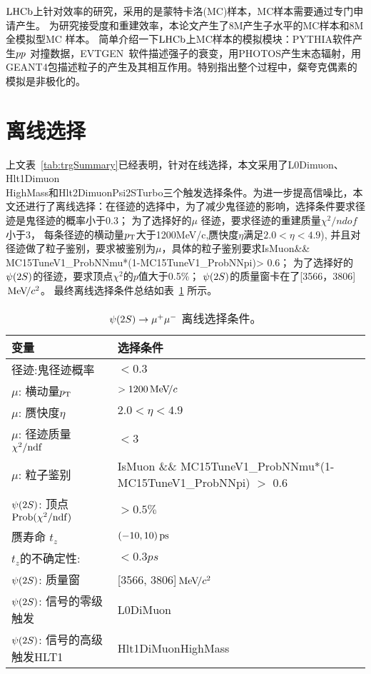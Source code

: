 $\mbox{LHCb}$上针对效率的研究，采用的是蒙特卡洛(MC)样本，MC样本需要通过专门申请产生。
为研究接受度和重建效率，本论文产生了8M产生子水平的MC样本和8M全模拟型MC 样本。
简单介绍一下$\mbox{LHCb}$上MC样本的模拟模块：PYTHIA软件产生${pp}$ 对撞数据，EVTGEN~\cite{Belyaev:2011zza}软件描述强子的衰变，用PHOTOS产生末态辐射，用GEANT4包描述粒子的产生及其相互作用。特别指出整个过程中，粲夸克偶素的模拟是非极化的。

\section{离线选择}

上文表~\ref{tab:trgSummary}已经表明，针对在线选择，本文采用了L0Dimuon、Hlt1Dimuon\\HighMass和Hlt2DimuonPsi2STurbo三个触发选择条件。为进一步提高信噪比，本文还进行了离线选择：在径迹的选择中，为了减少鬼径迹的影响，选择条件要求径迹是鬼径迹的概率小于0.3；
为了选择好的$\mu$ 径迹，要求径迹的重建质量$\chi^{2}/ndof$ 小于3， 每条径迹的横动量$\mbox{$p_{\mathrm{ T}}$}$大于1200MeV/c,赝快度$\eta$满足$2.0<\eta<4.9$), 并且对径迹做了粒子鉴别，要求被鉴别为$\mu$，具体的粒子鉴别要求IsMuon\&\& MC15TuneV1\_ProbNNmu*(1-MC15TuneV1\_ProbNNpi)> 0.6；
为了选择好的${\psi{(2S)}}$的径迹，要求顶点$\chi^{2}$的$p$值大于0.5\%；
${\psi{(2S)}}$的质量窗卡在了[3566，3806]${\mathrm{\,Me\kern -0.1em V\!/}c^2}$。
最终离线选择条件总结如表~\ref{tab:selections} 所示。

\begin{table}[!htb]
\tabcolsep 5mm
\begin{center}
\caption{${\psi{(2S)}} \rightarrow \mu^+\mu^-$ 离线选择条件。}
\begin{tabular}{l|l}
\hline 变量& 选择条件 \\
\hline
径迹:鬼径迹概率 & $<0.3$\\
$\mu$: 横动量$\mbox{$p_{\mathrm{ T}}$}$ & $>1200{\mathrm{\,Me\kern -0.1em V\!/}c}$\\
$\mu$: 赝快度$\eta$ & $2.0<\eta<4.9$\\
$\mu$: 径迹质量 $ \chi^2/\mathrm{ndf}$&$<3$\\
$\mu$: 粒子鉴别 & \footnotesize {IsMuon \&\& MC15TuneV1\_ProbNNmu*(1-MC15TuneV1\_ProbNNpi) $>$ 0.6} \\
${\psi{(2S)}}$: 顶点 $\mathrm{Prob}(\chi^2/\mathrm{ndf})$ & $>0.5\%$\\
赝寿命 $t_{z}$ & $(-10, 10){\mathrm{ \,ps}}$\\
$t_{z}$的不确定性:& $<0.3ps$\\
${\psi{(2S)}}$: 质量窗 &[3566, 3806]${\mathrm{\,Me\kern -0.1em V\!/}c^2}$ \\
${\psi{(2S)}}$: 信号的零级触发 &  L0DiMuon\\
${\psi{(2S)}}$: 信号的高级触发HLT1 &  Hlt1DiMuonHighMass\\
\hline
\end{tabular}
\label{tab:selections}
\end{center}
\end{table}

